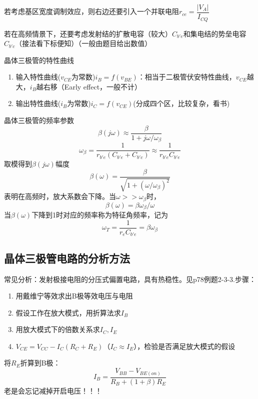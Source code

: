 \documentclass{ctexart}
\begin{document}
若考虑基区宽度调制效应，则右边还要引入一个并联电阻$r_{ce}=\dfrac{|V_A|}{I_{CQ}}$

若在高频情景下，还要考虑发射结的扩散电容（较大）$C_{b'e}$和集电结的势垒电容$C_{b'c}$（接法看下标便知）（一般由题目给出数值）

晶体三极管的特性曲线
\begin{enumerate}
    \item 输入特性曲线($v_{CE}$为常数)$i_B=f(v_{BE})$：相当于二极管伏安特性曲线，$v_{CE}$越大，$i_B$越右移（Early effect，一般不计）
    \item 输出特性曲线($i_{B}$为常数)$i_C=f(v_{CE})$(分成四个区，比较复杂，看书)
\end{enumerate}
晶体三极管的频率参数
\begin{equation}
    \beta(j\omega)\approx\dfrac{\beta}{1+j\omega/\omega_\beta}
\end{equation}
\begin{equation}
    \omega_\beta=\dfrac{1}{r_{b'e}(C_{b'e}+C_{b'c})}\approx\dfrac{1}{r_{b'e}C_{b'e}}
\end{equation}
取模得到$\beta(j\omega)$幅度
\begin{equation}
    \beta(\omega)=\dfrac{\beta}{\sqrt{1+(\omega/\omega_\beta)^2}}
\end{equation}
表明在高频时，放大系数会下降。当$\omega>>\omega_\beta$时，
\begin{equation}
    \beta(\omega)=\beta\omega_\beta/\omega
\end{equation}
当$\beta(\omega)$下降到1时对应的频率称为特征角频率，记为
\begin{equation}
    \omega_T=\dfrac{1}{r_eC_{b'e}}=\beta\omega_\beta
\end{equation}
\subsection{晶体三极管电路的分析方法}
常见分析：发射极接电阻的分压式偏置电路，具有热稳性。见p78例题2-3-3.步骤：
\begin{enumerate}
    \item 用戴维宁等效求出B极等效电压与电阻
    \item 假设工作在放大模式，用折算法求$I_B$
    \item 用放大模式下的倍数关系求$I_C,I_E$
    \item $V_{CE}=V_{CC}-I_C(R_C+R_E)$（$I_C\approx I_E$），检验是否满足放大模式的假设
\end{enumerate}
将$R_E$折算到B极：
\begin{equation}
    I_B=\dfrac{V_{BB}-V_{BE(on)}}{R_B+(1+\beta)R_E}
\end{equation}
{\color{Red}老是会忘记减掉开启电压！！！}
\end{document}
